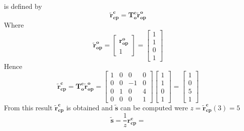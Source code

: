 \documentclass[12pt, letterpaper]{article}
\begin{document}
\begin{enumerate}
            is defined by
            \begin{equation*}
                \bm{\tilde{r}^c_{cp}=T_o^c\tilde{r}^{o}_{op}}
            \end{equation*}
            Where 
            \begin{equation*}
                \bm{\tilde{r}^{o}_{op}}=
                \begin{bmatrix}
                    \bm{r^o_{op}}\\
                    1
                \end{bmatrix}=
                \begin{bmatrix}
                    1\\
                    1\\
                    0\\
                    1
                \end{bmatrix}
            \end{equation*}
            Hence
            \begin{equation*}
                \bm{\tilde{r}^c_{cp}=T_o^c\tilde{r}^{o}_{op}}=
                \begin{bmatrix}
                    1 & 0 & 0 & 0\\
                    0 & 0 & -1 & 0\\
                    0 & 1 & 0 & 4\\
                    0 & 0 & 0 & 1
                \end{bmatrix}
                \begin{bmatrix}
                    1\\
                    1\\
                    0\\
                    1
                \end{bmatrix}=
                \begin{bmatrix}
                    1\\
                    0\\
                    5\\
                    1
                \end{bmatrix}
            \end{equation*}
            From this result $\bm{\tilde{r}^c_{cp}}$ is obtained and $\bm{\tilde{s}}$ can be
            computed were $z=\bm{\tilde{r}^c_{cp}}(3)=5$
            \begin{equation*}
                \bm{\tilde{s}}=\frac{1}{z}\bm{{r}^c_{cp}}=

\end{equation*}
\end{enumerate}
\end{document}
